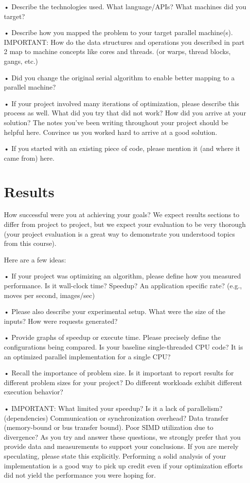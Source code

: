 \documentclass[11pt]{article}
\begin{document}
• Describe the technologies used. What language/APIs? What machines did you target?

• Describe how you mapped the problem to your target parallel machine(s). IMPORTANT: How do the data structures and operations you described in part 2 map to machine concepts like cores and threads. (or warps, thread blocks, gangs, etc.)

• Did you change the original serial algorithm to enable better mapping to a parallel machine?

• If your project involved many iterations of optimization, please describe this process as well. What did you try that did not work? How did you arrive at your solution? The notes you’ve been writing throughout your project should be helpful here. Convince us you worked hard to arrive at a good solution.

• If you started with an existing piece of code, please mention it (and where it came
from) here.

\section{Results}

How successful were you at achieving your goals? We expect results sections to differ from project to project, but we expect your evaluation to be very thorough (your project evaluation is a great way to demonstrate you understood topics from this course).

Here are a few ideas:

• If your project was optimizing an algorithm, please define how you measured performance. Is it wall-clock time? Speedup? An application specific rate? (e.g., moves per second, images/sec)

• Please also describe your experimental setup. What were the size of the inputs? How were requests generated?

• Provide graphs of speedup or execute time. Please precisely define the configurations being compared. Is your baseline single-threaded CPU code? It is an optimized parallel implementation for a single CPU?

• Recall the importance of problem size. Is it important to report results for different problem sizes for your project? Do different workloads exhibit different execution behavior?

• IMPORTANT: What limited your speedup? Is it a lack of parallelism? (dependencies) Communication or synchronization overhead? Data transfer (memory-bound or bus transfer bound). Poor SIMD utilization due to divergence? As you try and answer these questions, we strongly prefer that you provide data and measurements to support your conclusions. If you are merely speculating, please state this explicitly. Performing a solid analysis of your implementation is a good way to pick up credit even if your optimization efforts did not yield the performance you were hoping for.
\end{document}
